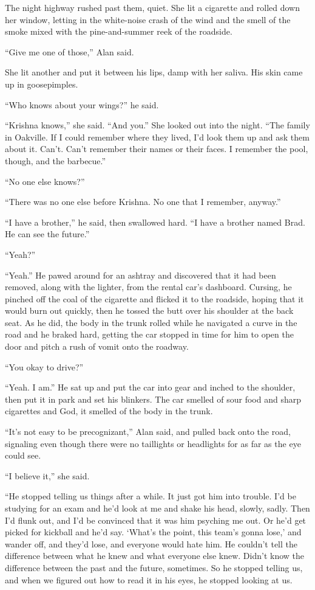 \documentclass{article}
\begin{document}
The night highway rushed past them, quiet.  She lit a cigarette and
rolled down her window, letting in the white-noise crash of the wind
and the smell of the smoke mixed with the pine-and-summer reek of the
roadside.

``Give me one of those,'' Alan said.

She lit another and put it between his lips, damp with her saliva. 
His skin came up in goosepimples.

``Who knows about your wings?'' he said.

``Krishna knows,'' she said.  ``And you.'' She looked out into the
night.  ``The family in Oakville.  If I could remember where they
lived, I'd look them up and ask them about it.  Can't.  Can't remember
their names or their faces.  I remember the pool, though, and the
barbecue.''

``No one else knows?''

``There was no one else before Krishna.  No one that I remember,
anyway.''

``I have a brother,'' he said, then swallowed hard.  ``I have a
brother named Brad.  He can see the future.''

``Yeah?''

``Yeah.'' He pawed around for an ashtray and discovered that it had
been removed, along with the lighter, from the rental car's dashboard. 
Cursing, he pinched off the coal of the cigarette and flicked it to
the roadside, hoping that it would burn out quickly, then he tossed
the butt over his shoulder at the back seat.  As he did, the body in
the trunk rolled while he navigated a curve in the road and he braked
hard, getting the car stopped in time for him to open the door and
pitch a rush of vomit onto the roadway.

``You okay to drive?''

``Yeah.  I am.'' He sat up and put the car into gear and inched to the
shoulder, then put it in park and set his blinkers.  The car smelled
of sour food and sharp cigarettes and God, it smelled of the body in
the trunk.

``It's not easy to be precognizant,'' Alan said, and pulled back onto
the road, signaling even though there were no taillights or headlights
for as far as the eye could see.

``I believe it,'' she said.

``He stopped telling us things after a while.  It just got him into
trouble.  I'd be studying for an exam and he'd look at me and shake
his head, slowly, sadly.  Then I'd flunk out, and I'd be convinced
that it was him psyching me out.  Or he'd get picked for kickball and
he'd say.  `What's the point, this team's gonna lose,' and wander off,
and they'd lose, and everyone would hate him.  He couldn't tell the
difference between what he knew and what everyone else knew.  Didn't
know the difference between the past and the future, sometimes.  So he
stopped telling us, and when we figured out how to read it in his
eyes, he stopped looking at us.
\end{document}
